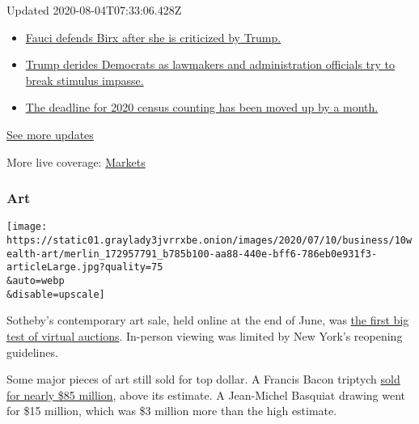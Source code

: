 Updated 2020-08-04T07:33:06.428Z

\begin{itemize}
\tightlist
\item
  \href{https://www.nytimes3xbfgragh.onion/2020/08/03/world/coronavirus-covid-19.html?action=click\&pgtype=Article\&state=default\&region=MAIN_CONTENT_1\&context=storylines_live_updates\#link-4547638f}{Fauci
  defends Birx after she is criticized by Trump.}
\item
  \href{https://www.nytimes3xbfgragh.onion/2020/08/03/world/coronavirus-covid-19.html?action=click\&pgtype=Article\&state=default\&region=MAIN_CONTENT_1\&context=storylines_live_updates\#link-15e7f995}{Trump
  derides Democrats as lawmakers and administration officials try to
  break stimulus impasse.}
\item
  \href{https://www.nytimes3xbfgragh.onion/2020/08/03/world/coronavirus-covid-19.html?action=click\&pgtype=Article\&state=default\&region=MAIN_CONTENT_1\&context=storylines_live_updates\#link-e5a2cda}{The
  deadline for 2020 census counting has been moved up by a month.}
\end{itemize}

\href{https://www.nytimes3xbfgragh.onion/2020/08/03/world/coronavirus-covid-19.html?action=click\&pgtype=Article\&state=default\&region=MAIN_CONTENT_1\&context=storylines_live_updates}{See
more updates}

More live coverage:
\href{https://www.nytimes3xbfgragh.onion/live/2020/08/03/business/stock-market-today-coronavirus?action=click\&pgtype=Article\&state=default\&region=MAIN_CONTENT_1\&context=storylines_live_updates}{Markets}

\hypertarget{art}{%
\subsubsection{\texorpdfstring{\textbf{Art}}{Art}}\label{art}}

\texttt{[image: https://static01.graylady3jvrrxbe.onion/images/2020/07/10/business/10wealth-art/merlin\_172957791\_b785b100-aa88-440e-bff6-786eb0e931f3-articleLarge.jpg?quality=75\\\&auto=webp\\\&disable=upscale]}

Sotheby's contemporary art sale, held online at the end of June, was
\href{https://www.nytimes3xbfgragh.onion/2020/06/30/arts/design/sothebys-online-auction.html}{the
first big test of virtual auctions}. In-person viewing was limited by
New York's reopening guidelines.

Some major pieces of art still sold for top dollar. A Francis Bacon
triptych
\href{https://www.nytimes3xbfgragh.onion/2020/06/29/arts/design/sothebys-online-auction-francis-bacon.html}{sold
for nearly \$85 million}, above its estimate. A Jean-Michel Basquiat
drawing went for \$15 million, which was \$3 million more than the high
estimate.

